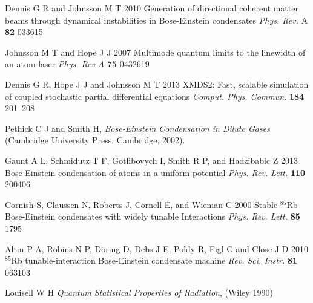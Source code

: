 \documentclass{iopart}
\begin{document}
\begin{thebibliography}{10}
 Dennis G R and Johnsson M T 2010 Generation of directional coherent matter beams through dynamical instabilities in Bose-Einstein condensates \emph{Phys. Rev.} A {\bf 82} 033615

 Johnsson M T and Hope J J 2007 Multimode quantum limits to the linewidth of an atom laser \emph{Phys. Rev A} {\bf 75} 0432619

 Dennis G R, Hope J J and Johnsson M T 2013 XMDS2: Fast, scalable simulation of coupled stochastic partial differential equations \emph{Comput. Phys. Commun.} {\bf 184} 201--208

 Pethick C J and Smith H, \emph{Bose-Einstein Condensation in Dilute Gases} (Cambridge University Press, Cambridge, 2002).

 Gaunt A L, Schmidutz T F, Gotlibovych I, Smith R P, and Hadzibabic Z 2013 Bose-Einstein condensation of atoms in a uniform potential \emph{Phys. Rev. Lett.} {\bf 110} 200406

 Cornish S, Claussen N, Roberts J, Cornell E, and Wieman C 2000 Stable $^{85}$Rb Bose-Einstein condensates with widely tunable Interactions \emph{Phys. Rev. Lett.} {\bf 85} 1795

 Altin P A, Robins N P, D{\"{o}}ring D, Debs J E, Poldy R, Figl C and Close J D 2010 $^{85}$Rb tunable-interaction Bose-Einstein condensate machine \emph{Rev. Sci. Instr.} {\bf 81} 063103

 Louisell W H \emph{Quantum Statistical Properties of Radiation}, (Wiley 1990)

\end{thebibliography}
\end{document}
